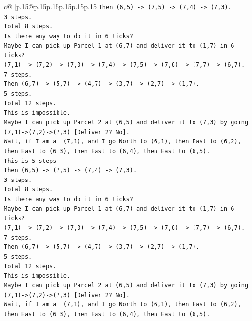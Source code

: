 \documentclass{article}
\begin{document}
{\begin{supertabular}{c@{$\;$}|p{.15\linewidth}@{}p{.15\linewidth}p{.15\linewidth}p{.15\linewidth}p{.15\linewidth}p{.15\linewidth}}
{{{\texttt{Then (6,5) {-}> (7,5) {-}> (7,4) {-}> (7,3).} \\
\texttt{3 steps.} \\
\texttt{Total 8 steps.} \\
\texttt{Is there any way to do it in 6 ticks?} \\
\texttt{Maybe I can pick up Parcel 1 at (6,7) and deliver it to (1,7) in 6 ticks?} \\
\texttt{(7,1) {-}> (7,2) {-}> (7,3) {-}> (7,4) {-}> (7,5) {-}> (7,6) {-}> (7,7) {-}> (6,7).} \\
\texttt{7 steps.} \\
\texttt{Then (6,7) {-}> (5,7) {-}> (4,7) {-}> (3,7) {-}> (2,7) {-}> (1,7).} \\
\texttt{5 steps.} \\
\texttt{Total 12 steps.} \\
\texttt{This is impossible.} \\
\texttt{Maybe I can pick up Parcel 2 at (6,5) and deliver it to (7,3) by going (7,1){-}>(7,2){-}>(7,3) {[}Deliver 2? No{]}.} \\
\texttt{Wait, if I am at (7,1), and I go North to (6,1), then East to (6,2), then East to (6,3), then East to (6,4), then East to (6,5).} \\
\texttt{This is 5 steps.} \\
\texttt{Then (6,5) {-}> (7,5) {-}> (7,4) {-}> (7,3).} \\
\texttt{3 steps.} \\
\texttt{Total 8 steps.} \\
\texttt{Is there any way to do it in 6 ticks?} \\
\texttt{Maybe I can pick up Parcel 1 at (6,7) and deliver it to (1,7) in 6 ticks?} \\
\texttt{(7,1) {-}> (7,2) {-}> (7,3) {-}> (7,4) {-}> (7,5) {-}> (7,6) {-}> (7,7) {-}> (6,7).} \\
\texttt{7 steps.} \\
\texttt{Then (6,7) {-}> (5,7) {-}> (4,7) {-}> (3,7) {-}> (2,7) {-}> (1,7).} \\
\texttt{5 steps.} \\
\texttt{Total 12 steps.} \\
\texttt{This is impossible.} \\
\texttt{Maybe I can pick up Parcel 2 at (6,5) and deliver it to (7,3) by going (7,1){-}>(7,2){-}>(7,3) {[}Deliver 2? No{]}.} \\
\texttt{Wait, if I am at (7,1), and I go North to (6,1), then East to (6,2), then East to (6,3), then East to (6,4), then East to (6,5).} \\
}}}
\end{supertabular}}
\end{document}
